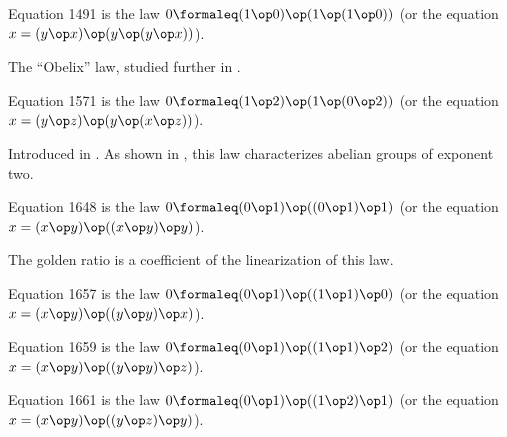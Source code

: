 \begin{definition}[Equation 1491]\label{eq1491}\leanok{}  Equation 1491 is the law $0 \formaleq  (1 \op 0) \op (1 \op (1 \op 0))$ (or the equation $x = (y \op x) \op (y \op (y \op x))$).
\end{definition}

The ``Obelix'' law, studied further in .

\begin{definition}[Equation 1571]\label{eq1571}\leanok{}  Equation 1571 is the law $0 \formaleq  (1 \op 2) \op (1 \op (0 \op 2))$ (or the equation $x = (y \op z) \op (y \op (x \op z))$).
\end{definition}

Introduced in \cite{mendelsohn-padmanabhan}.  As shown in , this law characterizes abelian groups of exponent two.

\begin{definition}[Equation 1648]\label{eq1648}\leanok{}  Equation 1648 is the law $0 \formaleq  (0 \op 1) \op ((0 \op 1) \op 1)$ (or the equation $x = (x \op y) \op ((x \op y) \op y)$).
\end{definition}

The golden ratio is a coefficient of the linearization of this law.

\begin{definition}[Equation 1657]\label{eq1657}\leanok{}  Equation 1657 is the law $0 \formaleq  (0 \op 1) \op ((1 \op 1) \op 0)$ (or the equation $x = (x \op y) \op ((y \op y) \op x)$).
\end{definition}

\begin{definition}[Equation 1659]\label{eq1659}\leanok{}  Equation 1659 is the law $0 \formaleq  (0 \op 1) \op ((1 \op 1) \op 2)$ (or the equation $x = (x \op y) \op ((y \op y) \op z)$).
\end{definition}

\begin{definition}[Equation 1661]\label{eq1661}\leanok{}  Equation 1661 is the law $0 \formaleq  (0 \op 1) \op ((1 \op 2) \op 1)$ (or the equation $x = (x \op y) \op ((y \op z) \op y)$).
\end{definition}

